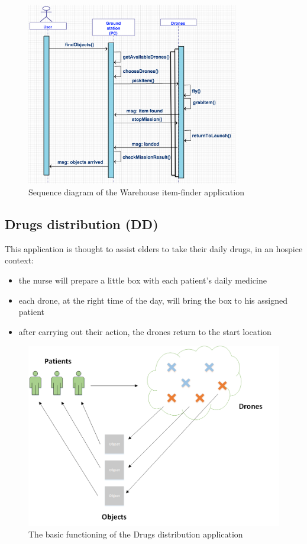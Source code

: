 \begin{figure}[H]
  \centering
  \includegraphics[width=\linewidth, height=8cm]{pictures/WIF_sequence.png}
    \caption{Sequence diagram of the Warehouse item-finder application}
  \label{fig:WISSequence}
\end{figure}

\newpage

\subsection{Drugs distribution (DD)}\label{dd}

This application is thought to assist elders to take their daily drugs, in an hospice context:

\begin{itemize}
\itemsep2pt
\item{
the nurse will prepare a little box with each patient’s daily medicine
}
\item{
each drone, at the right time of the day, will bring the box to his assigned patient
}
\item{
after carrying out their action, the drones return to the start location
}

\end{itemize}


\begin{figure}[H]
  \centering
  \includegraphics[width=\linewidth]{pictures/DD.png}
  \caption{The basic functioning of the Drugs distribution application}
  \label{fig:DD}
\end{figure}


